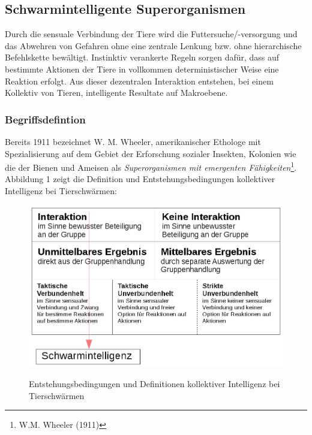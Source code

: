 \documentclass[a4paper, 11pt]{article}
\begin{document}
\subsection{Schwarmintelligente Superorganismen}
Durch die sensuale Verbindung der Tiere wird die Futtersuche/-versorgung und das Abwehren von Gefahren ohne eine zentrale Lenkung bzw. ohne hierarchische Befehlskette bewältigt. Instinktiv verankerte Regeln sorgen dafür, dass auf bestimmte Aktionen der Tiere in vollkommen deterministischer Weise eine Reaktion erfolgt. Aus dieser dezentralen Interaktion entstehen, bei einem Kollektiv von Tieren, intelligente Resultate auf Makroebene.
\subsubsection{Begriffsdefintion}
Bereits 1911 bezeichnet W. M. Wheeler, amerikanischer Ethologe mit Spezialisierung auf dem Gebiet der Erforschung sozialer Insekten, Kolonien wie die der Bienen und Ameisen als \textit{Superorganismen mit emergenten Fähigkeiten}\footnote{W.M. Wheeler (1911)}. Abbildung 1 zeigt die Definition und Entstehungsbedingungen kollektiver Intelligenz bei Tierschwärmen:\newline
\begin{figure}[h]
	\begin{center}
	\includegraphics[width=1\textwidth]{schwarmintelligenz}
		\label{defabb}
	\end{center}
	\hspace{1in}\parbox{4in}{\caption[Entstehungsbedingungen und Definitionen kollektiver Intelligenz bei Tierschwärmen]{Entstehungsbedingungen und Definitionen kollektiver Intelligenz bei Tierschwärmen\footnotemark}}
\end{figure}
\end{document}
